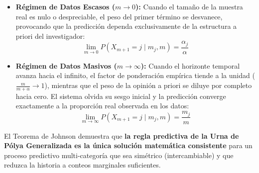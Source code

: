 \begin{itemize}
    \item \textbf{Régimen de Datos Escasos ($m \to 0$):} Cuando el tamaño de la muestra real es nulo o despreciable, el peso del primer término se desvanece, provocando que la predicción dependa exclusivamente de la estructura a priori del investigador:
    \begin{equation*}
        \lim_{m \to 0} P(X_{m+1} = j \mid m_j, m) = \frac{\alpha_j}{\alpha}
    \end{equation*}
    
    \item \textbf{Régimen de Datos Masivos ($m \to \infty$):} Cuando el horizonte temporal avanza hacia el infinito, el factor de ponderación empírica tiende a la unidad ($\frac{m}{m+\alpha} \to 1$), mientras que el peso de la opinión a priori se diluye por completo hacia cero. El sistema olvida su sesgo inicial y la predicción converge exactamente a la proporción real observada en los datos:
    \begin{equation*}
        \lim_{m \to \infty} P(X_{m+1} = j \mid m_j, m) = \frac{m_j}{m}
    \end{equation*}
\end{itemize}
El Teorema de Johnson demuestra que \textbf{la regla predictiva de la Urna de Pólya Generalizada es la única solución matemática consistente} para un proceso predictivo multi-categoría que sea simétrico (intercambiable) y que reduzca la historia a conteos marginales suficientes. 
